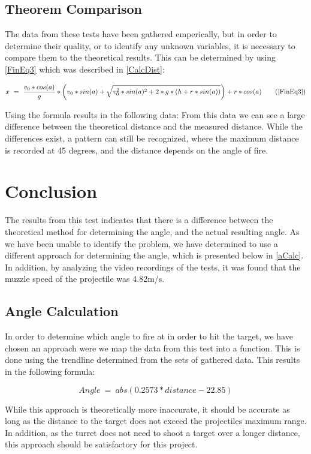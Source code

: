\subsection{Theorem Comparison}
The data from these tests have been gathered emperically, but in order to
determine their quality, or to identify any unknown variables, it is necessary
to compare them to the theoretical results. This can be determined by using
\autoref{FinEq3} which was described in \autoref{CalcDist}:

\begin{equation*}
x\ =\ \frac{v_0*cos(a)}{g}* \left(
v_0*sin(a)+\sqrt{v_0^2*sin(a)^2+2*g*(h+r*sin(a))}\right)+r*cos(a)
\tag{\ref*{FinEq3}}
\end{equation*}

Using the formula results in the following data:
From this data we can see a large difference between the theoretical distance
and the measured distance. While the differences exist, a pattern can still be
recognized, where the maximum distance is recorded at 45 degrees, and the
distance depends on the angle of fire. 

\section{Conclusion}
The results from this test indicates that there is a difference between the
theoretical method for determining the angle, and the actual resulting angle. As
we have been unable to identify the problem, we have determined to use a
different approach for determining the angle, which is presented below in
\autoref{aCalc}. In addition, by analyzing the video recordings of the tests, it
was found that the muzzle speed of the projectile was 4.82m/s.

\subsection{Angle Calculation}\label{aCalc}
In order to determine which angle to fire at in order to hit the target, we have
chosen an approach were we map the data from this test into a function. This is
done using the trendline determined from the sets of gathered data. This results
in the following formula:

\begin{equation}\label{angleCalc}
Angle\ =\ abs(0.2573 * distance - 22.85)
\end{equation} 

While this approach is theoretically more inaccurate, it should be
accurate as long as the distance to the target does not exceed the projectiles
maximum range. In addition, as the turret does not need to shoot a target over a
longer distance, this approach should be satisfactory for this project.
